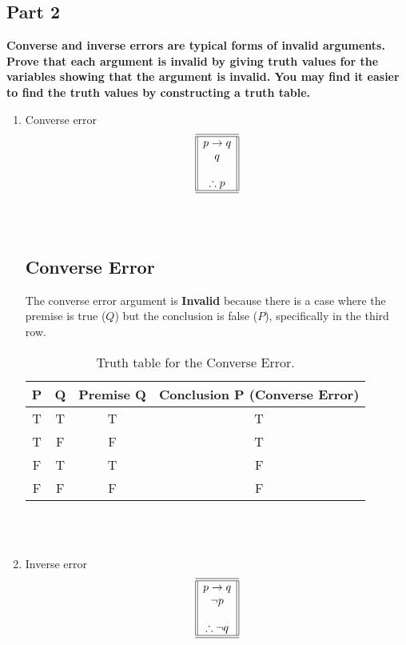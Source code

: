 \documentclass{amsart}
\theoremstyle{definition}
\theoremstyle{Exercise}
\theoremstyle{remark}
\theoremstyle{rule}
\numberwithin{equation}{section}
\begin{document}
\subsection*{Part 2}
{\bf Converse and inverse errors are typical forms of invalid arguments. Prove that each argument is invalid by giving truth values for the variables showing that the argument is invalid. You may find it easier to find the truth values by constructing a truth table.}\\
 \begin{enumerate}[label=(\alph*)]
\item Converse error
\[
\begin{array}{||c||}
\hline \hline
p \to q\\
q\\
\\
\therefore p\\
\hline \hline
\end{array}
\]\\\\
        \subsection*{Converse Error}
        The converse error argument is \textbf{Invalid} because there is a case where the premise is true (\( Q \)) but the conclusion is false (\( P \)), specifically in the third row.
        
        \begin{table}[h]
          \centering
          \begin{tabular}{cccc}
            \toprule
            P & Q & Premise Q & Conclusion P (Converse Error) \\
            \midrule
            T & T & T         & T                             \\
            T & F & F         & T                             \\
            F & T & T         & F                             \\
            F & F & F         & F                             \\
            \bottomrule
          \end{tabular}
          \caption{Truth table for the Converse Error.}
          \label{tab:converse_error}
        \end{table}
 \\\\
\item Inverse error
\[
\begin{array}{||c||}
\hline \hline
p \to q\\
\neg p\\
\\
\therefore \neg q\\
\hline \hline
\end{array}
\]\\\\

\end{enumerate}
\end{document}
